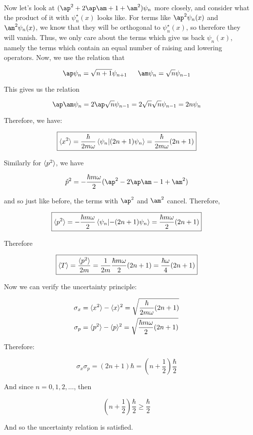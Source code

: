\documentclass[10pt]{article}
\begin{document}
\begin{solution}
        Now let's look at $(\ap^2 + 2\ap \am + 1+ \am^2) \psi_n$ more closely, and consider what the product of it with $\psi_n^\star(x)$ looks like. For terms like $\ap^2\psi_n(x)$ and $\am^2\psi_n(x)$, we know that they will be orthogonal to $\psi_n^\star(x)$, so therefore they will vanish. Thus, we only care about the terms which give us back $\psi_n(x)$, namely the terms which contain an equal number of raising and lowering operators. Now, we use the relation that 

        \[ \ap \psi_n = \sqrt{n+1} \psi_{n+1}\phantom{aaa} \am \psi_n = \sqrt n \psi_{n-1}\]

        This gives us the relation 

        \[ \ap \am \psi_n = 2\ap \sqrt{n} \psi_{n - 1} = 2\sqrt{n} \sqrt{n} \psi_{n - 1} = 2n \psi_n\]

        Therefore, we have: 

        \[ \boxed{\langle x^2 \rangle = \frac{\hbar}{2m \omega} \braket{\psi_n}{(2n + 1) \psi_n} =  \frac{\hbar}{2m \omega} (2n + 1)}\]

        Similarly for $\langle p^2 \rangle$, we have 

        \[ \hat p^2 = -\frac{\hbar m \omega}{2} (\ap^2 - 2\ap \am -1 + \am^2)\] 

        and so just like before, the terms with $\ap^2$ and $\am^2$ cancel. Therefore, 


        \[ \boxed{\langle p^2 \rangle = -\frac{\hbar m \omega}{2} \braket{\psi_n}{-(2n + 1)\psi_n} = \frac{\hbar m \omega}{2} (2n +1)}\]

        Therefore

        \[ \boxed{\langle T \rangle = \frac{\langle p^2 \rangle}{2m} = \frac{1}{2m} \frac{\hbar m \omega}{2}(2n + 1) = \frac{\hbar \omega}{4} (2n + 1)}\]
        
        Now we can verify the uncertainty principle: 

        \begin{align*}
            \sigma_x &= \langle x^2 \rangle - \langle x \rangle^2 = \sqrt{\frac{\hbar}{2m \omega}(2n + 1)}\\
            \sigma_p &= \langle p^2 \rangle - \langle p \rangle^2 = \sqrt{\frac{\hbar m \omega}{2}(2n + 1)}
        \end{align*}

        Therefore:

        \[ \sigma_x\sigma_p = (2n + 1)\hbar = \left(n + \frac 12\right) \frac{\hbar}{2}\] 


        And since $n = 0, 1, 2, \dots$, then 

        \[ \left(n + \frac 12\right) \frac{\hbar}{2} \ge \frac{\hbar}{2}\] 

        And so the uncertainty relation is satisfied.
    \end{solution}
\end{document}
